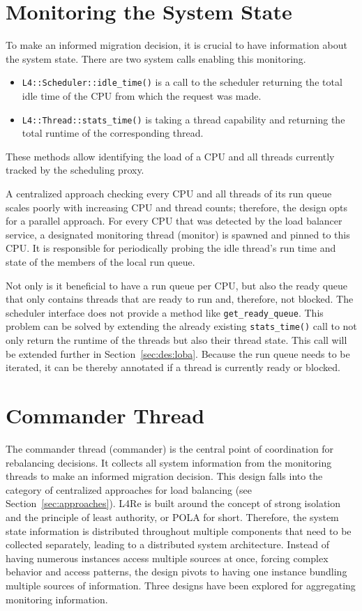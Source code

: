 \section{Monitoring the System State}
\label{sec:des:monitoring}

To make an informed migration decision, it is crucial to have information about the system state.
There are two system calls enabling this monitoring.
\begin{itemize}
	\item \texttt{L4::Scheduler::idle\_time()} is a call to the scheduler returning the total idle time of the CPU from which the request was made.
	\item \texttt{L4::Thread::stats\_time()} is taking a thread capability and returning the total runtime of the corresponding thread.
\end{itemize}
These methods allow identifying the load of a CPU and all threads currently tracked by the scheduling proxy.

A centralized approach checking every CPU and all threads of its run queue scales poorly with increasing CPU and thread counts; therefore, the design opts for a parallel approach.
For every CPU that was detected by the load balancer service, a designated monitoring thread (monitor) is spawned and pinned to this CPU.
It is responsible for periodically probing the idle thread's run time and state of the members of the local run queue.

Not only is it beneficial to have a run queue per CPU, but also the ready queue that only contains threads that are ready to run and, therefore, not blocked.
The scheduler interface does not provide a method like \texttt{get\_ready\_queue}.
This problem can be solved by extending the already existing \texttt{stats\_time()} call to not only return the runtime of the threads but also their thread state.
This call will be extended further in Section~\ref{sec:des:loba}.
Because the run queue needs to be iterated, it can be thereby annotated if a thread is currently ready or blocked.

\section{Commander Thread}
\label{sec:commander}

The commander thread (commander) is the central point of coordination for rebalancing decisions.
It collects all system information from the monitoring threads to make an informed migration decision.
This design falls into the category of centralized approaches for load balancing (see Section~\ref{sec:approaches}).
L4Re is built around the concept of strong isolation and the principle of least authority, or POLA for short.
Therefore, the system state information is distributed throughout multiple components that need to be collected separately, leading to a distributed system architecture.
Instead of having numerous instances access multiple sources at once, forcing complex behavior and access patterns, the design pivots to having one instance bundling multiple sources of information.
Three designs have been explored for aggregating monitoring information.

